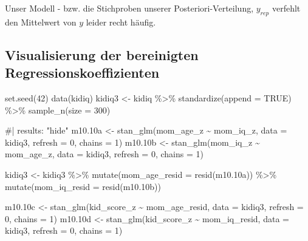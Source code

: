 \documentclass[
  a4paper,
  DIV=11]{scrreprt}
\newenvironment{Shaded}{\begin{snugshade}}{\end{snugshade}}
\newcommand{\AttributeTok}[1]{\textcolor[rgb]{0.40,0.45,0.13}{#1}}
\newcommand{\CommentTok}[1]{\textcolor[rgb]{0.37,0.37,0.37}{#1}}
\newcommand{\ConstantTok}[1]{\textcolor[rgb]{0.56,0.35,0.01}{#1}}
\newcommand{\DecValTok}[1]{\textcolor[rgb]{0.68,0.00,0.00}{#1}}
\newcommand{\FloatTok}[1]{\textcolor[rgb]{0.68,0.00,0.00}{#1}}
\newcommand{\FunctionTok}[1]{\textcolor[rgb]{0.28,0.35,0.67}{#1}}
\newcommand{\NormalTok}[1]{\textcolor[rgb]{0.00,0.23,0.31}{#1}}
\newcommand{\OtherTok}[1]{\textcolor[rgb]{0.00,0.23,0.31}{#1}}
\newcommand{\SpecialCharTok}[1]{\textcolor[rgb]{0.37,0.37,0.37}{#1}}
\theoremstyle{definition}
\theoremstyle{remark}
\begin{document}
Unser Modell - bzw. die Stichproben unserer Posteriori-Verteilung,
\(y_{rep}\) verfehlt den Mittelwert von \(y\) leider recht häufig.

\hypertarget{visualisierung-der-bereinigten-regressionskoeffizienten}{%
\subsection{Visualisierung der bereinigten
Regressionskoeffizienten}\label{visualisierung-der-bereinigten-regressionskoeffizienten}}

\begin{Shaded}
\begin{Highlighting}[]
\FunctionTok{set.seed}\NormalTok{(}\DecValTok{42}\NormalTok{)}
\FunctionTok{data}\NormalTok{(kidiq)}
\NormalTok{kidiq3 }\OtherTok{\textless{}{-}} 
\NormalTok{  kidiq }\SpecialCharTok{\%\textgreater{}\%} 
  \FunctionTok{standardize}\NormalTok{(}\AttributeTok{append =} \ConstantTok{TRUE}\NormalTok{) }\SpecialCharTok{\%\textgreater{}\%} 
  \FunctionTok{sample\_n}\NormalTok{(}\AttributeTok{size =} \DecValTok{300}\NormalTok{)}

\CommentTok{\#| results: "hide"}
\NormalTok{m10}\FloatTok{.10}\NormalTok{a }\OtherTok{\textless{}{-}} \FunctionTok{stan\_glm}\NormalTok{(mom\_age\_z }\SpecialCharTok{\textasciitilde{}}\NormalTok{ mom\_iq\_z, }\AttributeTok{data =}\NormalTok{ kidiq3, }\AttributeTok{refresh =} \DecValTok{0}\NormalTok{, }\AttributeTok{chains =} \DecValTok{1}\NormalTok{)}
\NormalTok{m10}\FloatTok{.10}\NormalTok{b }\OtherTok{\textless{}{-}} \FunctionTok{stan\_glm}\NormalTok{(mom\_iq\_z }\SpecialCharTok{\textasciitilde{}}\NormalTok{ mom\_age\_z, }\AttributeTok{data =}\NormalTok{ kidiq3, }\AttributeTok{refresh =} \DecValTok{0}\NormalTok{, }\AttributeTok{chains =} \DecValTok{1}\NormalTok{)}

\NormalTok{kidiq3 }\OtherTok{\textless{}{-}}
\NormalTok{  kidiq3 }\SpecialCharTok{\%\textgreater{}\%} 
  \FunctionTok{mutate}\NormalTok{(}\AttributeTok{mom\_age\_resid =} \FunctionTok{resid}\NormalTok{(m10}\FloatTok{.10}\NormalTok{a)) }\SpecialCharTok{\%\textgreater{}\%} 
  \FunctionTok{mutate}\NormalTok{(}\AttributeTok{mom\_iq\_resid =} \FunctionTok{resid}\NormalTok{(m10}\FloatTok{.10}\NormalTok{b))}


\NormalTok{m10}\FloatTok{.10}\NormalTok{c }\OtherTok{\textless{}{-}} \FunctionTok{stan\_glm}\NormalTok{(kid\_score\_z }\SpecialCharTok{\textasciitilde{}}\NormalTok{ mom\_age\_resid, }\AttributeTok{data =}\NormalTok{ kidiq3, }\AttributeTok{refresh =} \DecValTok{0}\NormalTok{, }\AttributeTok{chains =} \DecValTok{1}\NormalTok{)}
\NormalTok{m10}\FloatTok{.10}\NormalTok{d }\OtherTok{\textless{}{-}} \FunctionTok{stan\_glm}\NormalTok{(kid\_score\_z }\SpecialCharTok{\textasciitilde{}}\NormalTok{ mom\_iq\_resid, }\AttributeTok{data =}\NormalTok{ kidiq3, }\AttributeTok{refresh =} \DecValTok{0}\NormalTok{, }\AttributeTok{chains =} \DecValTok{1}\NormalTok{)}



\end{Highlighting}
\end{Shaded}
\end{document}
